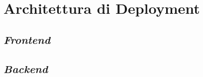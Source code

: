 \section{Architettura di Deployment}

\subsection{\textit{Frontend}}

\subsection{\textit{Backend}}
